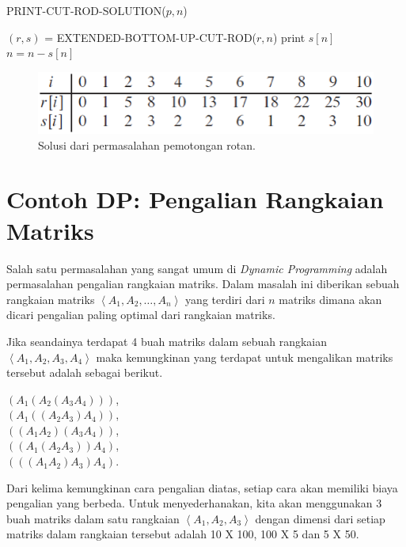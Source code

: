 \begin{algorithm}[H]
	\caption{PRINT-CUT-ROD-SOLUTION($p,n$)}
	\label{algo:printCutRodSolution}
	\begin{algorithmic}[1]
		\STATE $(r,s)$ = EXTENDED-BOTTOM-UP-CUT-ROD($r,n$)
			\STATE print $s[n]$
			\STATE $n = n - s[n]$
		\ENDWHILE
	\end{algorithmic}
\end{algorithm}

\begin{figure}[H]%
\centering
\includegraphics[scale=0.5]{fig/CutRodSolution.eps}%
\caption{Solusi dari permasalahan pemotongan rotan.}%
\label{fig:cutRodSolution}%
\end{figure}

\section{Contoh DP: Pengalian Rangkaian Matriks}

Salah satu permasalahan yang sangat umum di \textit{Dynamic Programming} adalah permasalahan pengalian rangkaian matriks. Dalam masalah ini diberikan sebuah rangkaian matriks $\left\langle A_{1},A_{2},\ldots,A_{n} \right\rangle$ yang terdiri dari $n$ matriks dimana akan dicari pengalian paling optimal dari rangkaian matriks.  

Jika seandainya terdapat 4 buah matriks dalam sebuah rangkaian $\left\langle A_{1},A_{2},A_{3},A_{4} \right\rangle$ maka kemungkinan yang terdapat untuk mengalikan matriks tersebut adalah sebagai berikut.


$(A_{1}(A_{2}(A_{3}A_{4})))$,\\
$(A_{1}((A_{2}A_{3})A_{4}))$,\\
$((A_{1}A_{2})(A_{3}A_{4}))$,\\
$((A_{1}(A_{2}A_{3}))A_{4})$,\\
$(((A_{1}A_{2})A_{3})A_{4})$.

Dari kelima kemungkinan cara pengalian diatas, setiap cara akan memiliki biaya pengalian yang berbeda. Untuk menyederhanakan, kita akan menggunakan 3 buah matriks dalam satu rangkaian $\left\langle A_{1},A_{2},A_{3} \right\rangle$ dengan dimensi dari setiap matriks dalam rangkaian tersebut adalah 10 X 100, 100 X 5 dan 5 X 50. 


